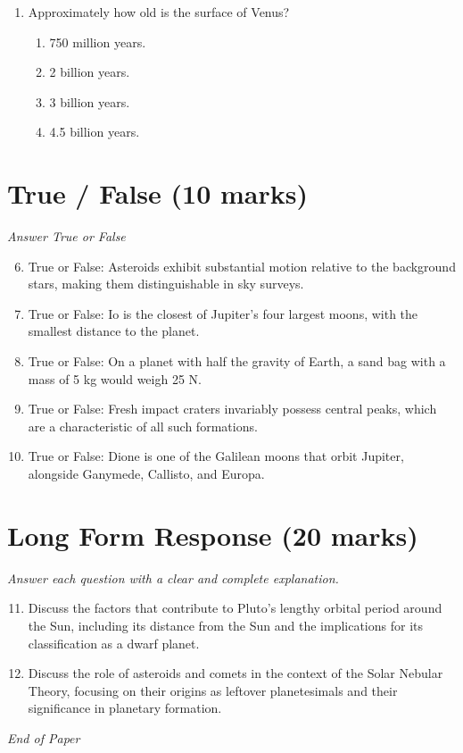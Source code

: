 \documentclass[12pt]{article}
\begin{document}
\begin{enumerate}[label=\arabic*.]
\begin{enumerate}[label=(\alph*)]
    \item Distance at which one astronomical unit measures one arcsecond from Earth.
    \item Orbital distance of the solar system around the center of the Milky Way in one year.
    \item Effective distance of the solar wind (i.e. the radius of the heliosphere).
    \item Historical distance to the brightest star Sirius.
\end{enumerate}
\item Approximately how old is the surface of Venus?
\begin{enumerate}[label=(\alph*)]
    \item 750 million years.
    \item 2 billion years.
    \item 3 billion years.
    \item 4.5 billion years.
\end{enumerate}
\end{enumerate}

\section*{True / False (10 marks)}
\textit{Answer True or False}
\begin{enumerate}[label=\arabic*.]
\setcounter{enumi}{5}
\item True or False: Asteroids exhibit substantial motion relative to the background stars, making them distinguishable in sky surveys.
\item True or False: Io is the closest of Jupiter's four largest moons, with the smallest distance to the planet.
\item True or False: On a planet with half the gravity of Earth, a sand bag with a mass of 5 kg would weigh 25 N.
\item True or False: Fresh impact craters invariably possess central peaks, which are a characteristic of all such formations.
\item True or False: Dione is one of the Galilean moons that orbit Jupiter, alongside Ganymede, Callisto, and Europa.
\end{enumerate}

\section*{Long Form Response (20 marks)}
\textit{Answer each question with a clear and complete explanation.}
\begin{enumerate}[label=\arabic*.]
\setcounter{enumi}{10}
\item Discuss the factors that contribute to Pluto's lengthy orbital period around the Sun, including its distance from the Sun and the implications for its classification as a dwarf planet.
\item Discuss the role of asteroids and comets in the context of the Solar Nebular Theory, focusing on their origins as leftover planetesimals and their significance in planetary formation.
\end{enumerate}

\vfill
\noindent\textit{End of Paper}
\end{document}
